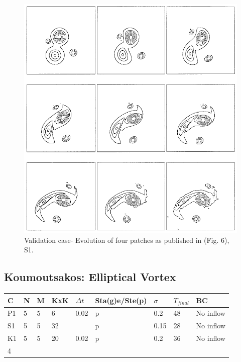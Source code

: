 \documentclass[letterpaper,12pt]{report}
\begin{document}
\begin{figure}
\centering
\includegraphics[width=5.5in]{StrainPatches.PNG}
\caption{\label{fig:StrainPatches}Validation case- Evolution of four patches as published in \cite{Strain1996} (Fig. 6), S1.}
\end{figure}

\subsection{Koumoutsakos: Elliptical Vortex}


\begin{table}[h]
\begin{tabular}{lllllllll}
\hline
C  & N & M & KxK & $\Delta t$ & Sta(g)e/Ste(p) & $\sigma$ & $T_{final}$ & BC        \\ \hline
P1 & 5 & 5 & 6   & 0.02     & p              & 0.2    & 48     & No inflow \\
S1 & 5 & 5 & 32  &          & p              & 0.15   & 28     & No inflow \\
K1 & 5 & 5 & 20  & 0.02     & p              & 0.2    & 36     & No inflow \\
4  &   &   &     &          &                &        &        &           \\ \hline
\end{tabular}
\end{table}
\end{document}
